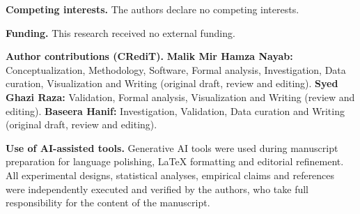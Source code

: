 \documentclass[11pt]{article}
\begin{document}
\textbf{Competing interests.} The authors declare no competing interests.

\textbf{Funding.} This research received no external funding.

\textbf{Author contributions (CRediT).} \textbf{Malik Mir Hamza Nayab:} Conceptualization, Methodology, Software, Formal analysis, Investigation, Data curation, Visualization and Writing (original draft, review and editing). \textbf{Syed Ghazi Raza:} Validation, Formal analysis, Visualization and Writing (review and editing). \textbf{Baseera Hanif:} Investigation, Validation, Data curation and Writing (original draft, review and editing).

\textbf{Use of AI-assisted tools.} Generative AI tools were used during manuscript preparation for language polishing, LaTeX formatting and editorial refinement. All experimental designs, statistical analyses, empirical claims and references were independently executed and verified by the authors, who take full responsibility for the content of the manuscript.

\FloatBarrier


\end{document}
